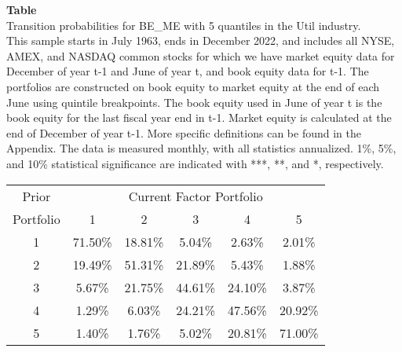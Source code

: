 \begin{table*}[ht!]
\raggedright
{}
\label{tab: transition_probs_BE_ME_Util_with_5_quantiles}
\textbf{Table \thetable} \\
Transition probabilities for BE_ME with 5 quantiles in the Util industry. \\
\hspace*{1em}This sample starts in July 1963, ends in December 2022, and includes all NYSE, AMEX, and NASDAQ common stocks for which we have market equity data for December of year t-1 and June of year t, and book equity data for t-1. The portfolios are constructed on book equity to market equity at the end of each June using quintile breakpoints.  The book equity used in June of year t is the book equity for the last fiscal year end in t-1.  Market equity is calculated at the end of December of year t-1.  More specific definitions can be found in the Appendix.  The data is measured monthly, with all statistics annualized.  1\%, 5\%, and 10\% statistical significance are indicated with ***, **, and *, respectively. \\
\vspace{0.5em}
\centering
\begin{adjustbox}{max width=\textwidth}
\begin{tabular}{@{}cccccc@{}}
\toprule
Prior & \multicolumn{5}{c}{Current Factor Portfolio} \\
Portfolio & 1 & 2 & 3 & 4 & 5 \\
\midrule
1 & 71.50\% & 18.81\% & 5.04\% & 2.63\% & 2.01\% \\
2 & 19.49\% & 51.31\% & 21.89\% & 5.43\% & 1.88\% \\
3 & 5.67\% & 21.75\% & 44.61\% & 24.10\% & 3.87\% \\
4 & 1.29\% & 6.03\% & 24.21\% & 47.56\% & 20.92\% \\
5 & 1.40\% & 1.76\% & 5.02\% & 20.81\% & 71.00\% \\
\bottomrule
\end{tabular}
\end{adjustbox}
\end{table*}